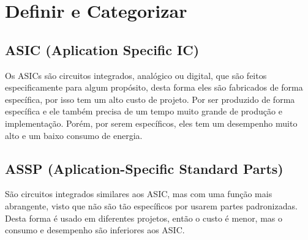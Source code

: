 \section{\esp Definir e Categorizar}
\subsection{ASIC (Aplication Specific IC)}
Os ASICs são circuitos integrados, analógico ou digital, que são feitos especificamente para algum propósito, desta forma eles são fabricados de forma específica, por isso tem um alto custo de projeto.
Por ser produzido de forma específica e ele também precisa de um tempo muito grande de produção e implementação.
Porém, por serem específicos, eles tem um desempenho muito alto e um baixo consumo de energia.



\subsection{ASSP (Aplication-Specific Standard Parts)}
São circuitos integrados similares aos ASIC, mas com uma função mais abrangente, visto que não são tão específicos por usarem partes padronizadas.
Desta forma é usado em diferentes projetos, então o custo é menor, mas o consumo e desempenho são inferiores aos ASIC.

